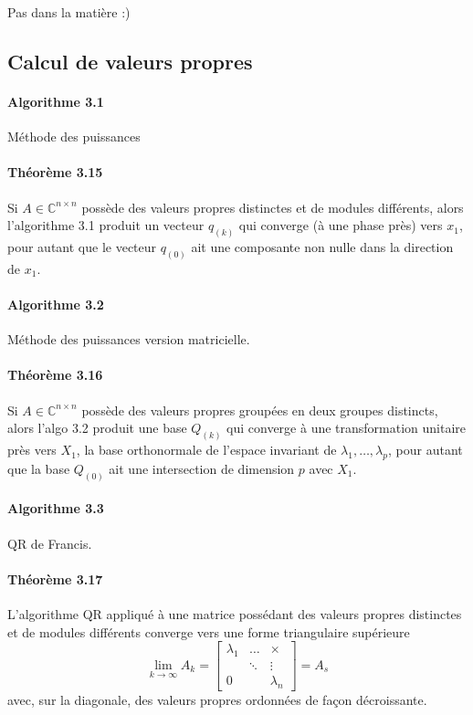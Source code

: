 Pas dans la matière :)

\subsection{Calcul de valeurs propres}
\paragraph{Algorithme 3.1} Méthode des puissances

\paragraph{Théorème 3.15} Si $A \in \mathbb{C}^{n\times n}$ possède des valeurs propres distinctes et de modules différents, alors l'algorithme 3.1 produit un vecteur $q_{(k)}$ qui converge (à une phase près) vers $x_1$, pour autant que le vecteur $q_{(0)}$ ait une composante non nulle dans la direction de $x_1$.

\paragraph{Algorithme 3.2} Méthode des puissances version matricielle.

\paragraph{Théorème 3.16} Si $A \in \mathbb{C}^{n\times n}$ possède des valeurs propres groupées en deux groupes distincts, alors l'algo 3.2 produit une base $Q_{(k)}$ qui converge à une transformation unitaire près vers $X_1$, la base orthonormale de l'espace invariant de $\lambda_1,\dots, \lambda_p$, pour autant que la base $Q_{(0)}$ ait une intersection de dimension $p$ avec $X_1$.

\paragraph{Algorithme 3.3} QR de Francis.

\paragraph{Théorème 3.17} L'algorithme QR appliqué à une matrice possédant des valeurs propres distinctes et de modules différents converge vers une forme triangulaire supérieure
$$ \lim_{k\rightarrow\infty} A_k = \begin{bmatrix}
\lambda_1 & \dots & \times \\
  & \ddots & \vdots \\
0 &   & \lambda_n
\end{bmatrix} = A_s$$ avec, sur la diagonale, des valeurs propres ordonnées de façon décroissante.

